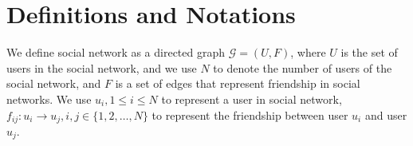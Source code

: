 \documentclass[a4paper]{article}
\begin{document}

\section{Definitions and Notations}

We define social network as a directed graph $\mathcal{G}=(U,F)$,
where $U$ is the set of users in the social network, and we use $N$ to
denote the number of users of the social network, and $F$ is a set of
edges that represent friendship in social networks. We use $u_i, 1\leq
i\leq N$ to represent a user in social network,
$f_{ij}:u_i\rightarrow u_j, i,j\in \{1,2,\ldots,N\}$ to represent the
friendship between user $u_i$ and user $u_j$.
\end{document}
